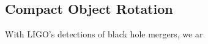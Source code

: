 {\color{orange}

\subsection{Compact Object Rotation}

With LIGO's detections of black hole mergers, we ar

}